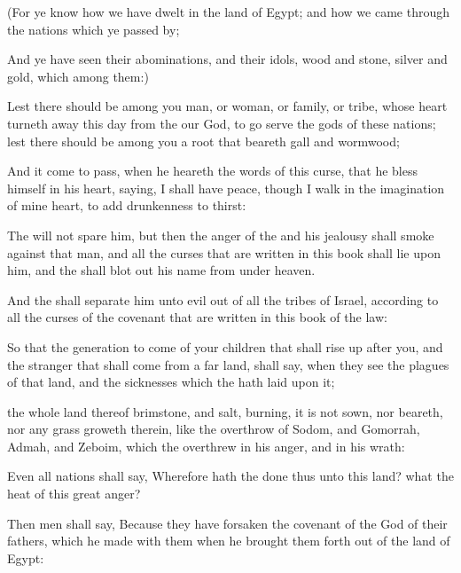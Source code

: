 {(For ye
know how we have
dwelt in the
land of
Egypt; and how we
came
through the
nations which ye passed
by;

And ye have
seen their
abominations, and their
idols,
wood and
stone,
silver and
gold, which
{} among them:)

Lest there should
be among you
man, or
woman, or
family, or
tribe, whose
heart turneth
away this
day from the
{} our
God, to
go
{}
serve the
gods of these
nations; lest there should
be among you a
root that
beareth
gall and
wormwood;

And it come to pass, when he
heareth the
words of this
curse, that he
bless himself in his
heart,
saying, I shall have
peace,
though I
walk in the
imagination of mine
heart, to
add
drunkenness to
thirst:

The
{}
will not
spare him, but then the
anger of the
{} and his
jealousy shall
smoke against that
man, and all the
curses that are
written in this
book shall
lie upon him, and the
{} shall blot
out his
name from under
heaven.

And the
{} shall
separate him unto
evil out of all the
tribes of
Israel, according to all the
curses of the
covenant that are
written in this
book of the
law:

So that the
generation to
come of your
children that shall rise
up
after you, and the
stranger that shall
come from a
far
land, shall
say, when they
see the
plagues of that
land, and the
sicknesses which the
{} hath
laid upon it;

 the whole
land thereof
{}
brimstone, and
salt,
{}
burning,
{} it is not
sown, nor
beareth, nor any
grass
groweth therein, like the
overthrow of
Sodom, and
Gomorrah,
Admah, and
Zeboim, which the
{}
overthrew in his
anger, and in his
wrath:

Even all
nations shall
say, Wherefore hath the
{}
done thus unto this
land? what
{} the
heat of this
great
anger?

Then men shall
say, Because they have
forsaken the
covenant of the
{}
God of their
fathers, which he
made with them when he brought them
forth out of the
land of
Egypt:

}
